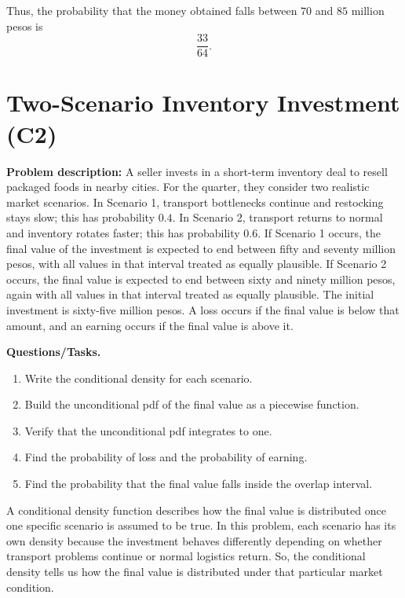 	Thus, the probability that the money obtained falls between $70$ and $85$ million pesos is
	\[
	\frac{33}{64}.
	\]
	
	\section{Two-Scenario Inventory Investment (C2)}
	
	\textbf{Problem description:}
	A seller invests in a short-term inventory deal to resell packaged foods in nearby cities. For the quarter, they consider two realistic market scenarios. In Scenario 1, transport bottlenecks continue and restocking stays slow; this has probability $0.4$. In Scenario 2, transport returns to normal and inventory rotates faster; this has probability $0.6$. If Scenario 1 occurs, the final value of the investment is expected to end between fifty and seventy million pesos, with all values in that interval treated as equally plausible. If Scenario 2 occurs, the final value is expected to end between sixty and ninety million pesos, again with all values in that interval treated as equally plausible. The initial investment is sixty-five million pesos. A loss occurs if the final value is below that amount, and an earning occurs if the final value is above it.
	
	\textbf{Questions/Tasks.}
	\begin{enumerate}[label=\textbf{\alph*)}]
		\item Write the conditional density for each scenario.
		\item Build the unconditional pdf of the final value as a piecewise function.
		\item Verify that the unconditional pdf integrates to one.
		\item Find the probability of loss and the probability of earning.
		\item Find the probability that the final value falls inside the overlap interval.
	\end{enumerate}
	
	A conditional density function describes how the final value is distributed once one specific scenario is assumed to be true. In this problem, each scenario has its own density because the investment behaves differently depending on whether transport problems continue or normal logistics return. So, the conditional density tells us how the final value is distributed under that particular market condition.
	
